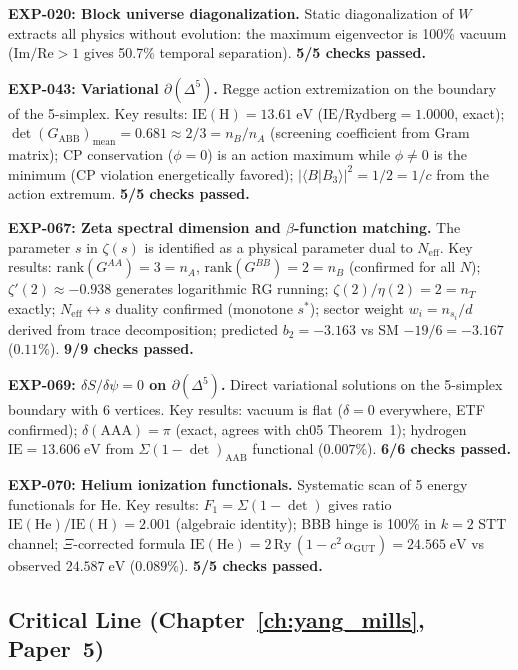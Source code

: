 \textbf{EXP-020: Block universe diagonalization.} Static diagonalization of $W$ extracts all physics without evolution: the maximum eigenvector is 100\% vacuum ($\text{Im}/\text{Re} > 1$ gives 50.7\% temporal separation). \textbf{5/5 checks passed.}

\textbf{EXP-043: Variational $\partial(\Delta^5)$.}  Regge action extremization on the boundary of the 5-simplex. Key results: $\text{IE}(\text{H}) = 13.61\;\text{eV}$ ($\text{IE}/\text{Rydberg} = 1.0000$, exact); $\det(G_\text{ABB})_\text{mean} = 0.681 \approx 2/3 = n_B/n_A$ (screening coefficient from Gram matrix); CP conservation ($\phi = 0$) is an action maximum while $\phi \neq 0$ is the minimum (CP violation energetically favored); $|\langle B|B_3\rangle|^2 = 1/2 = 1/c$ from the action extremum. \textbf{5/5 checks passed.}

\textbf{EXP-067: Zeta spectral dimension and $\beta$-function matching.}  The parameter $s$ in $\zeta(s)$ is identified as a physical parameter dual to $N_\text{eff}$. Key results: $\text{rank}(G^{AA}) = 3 = n_A$, $\text{rank}(G^{BB}) = 2 = n_B$ (confirmed for all $N$); $\zeta'(2) \approx -0.938$ generates logarithmic RG running; $\zeta(2)/\eta(2) = 2 = n_T$ exactly; $N_\text{eff} \leftrightarrow s$ duality confirmed (monotone $s^*$); sector weight $w_i = n_{s_i}/d$ derived from trace decomposition; predicted $b_2 = -3.163$ vs SM $-19/6 = -3.167$ ($0.11\%$). \textbf{9/9 checks passed.}

\textbf{EXP-069: $\delta S/\delta\psi = 0$ on $\partial(\Delta^5)$.}  Direct variational solutions on the 5-simplex boundary with 6 vertices. Key results: vacuum is flat ($\delta = 0$ everywhere, ETF confirmed); $\delta(\text{AAA}) = \pi$ (exact, agrees with ch05 Theorem~1); hydrogen $\text{IE} = 13.606\;\text{eV}$ from $\Sigma(1-\det)_\text{AAB}$ functional ($0.007\%$). \textbf{6/6 checks passed.}

\textbf{EXP-070: Helium ionization functionals.}  Systematic scan of 5 energy functionals for He. Key results: $F_1 = \Sigma(1-\det)$ gives ratio $\text{IE}(\text{He})/\text{IE}(\text{H}) = 2.001$ (algebraic identity); BBB hinge is 100\% in $k=2$ STT channel; $\Xi$-corrected formula $\text{IE}(\text{He}) = 2\,\text{Ry}\,(1 - c^2\,\alpha_\text{GUT}) = 24.565\;\text{eV}$ vs observed $24.587\;\text{eV}$ ($0.089\%$). \textbf{5/5 checks passed.}

\subsection{Critical Line (Chapter~\ref{ch:yang_mills}, Paper~5)}

